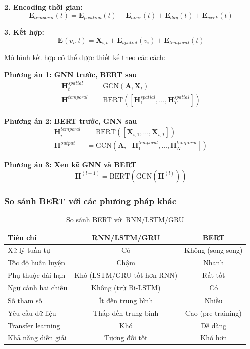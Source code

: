 \textbf{2. Encoding thời gian:}
\begin{equation}
\mathbf{E}_{temporal}(t) = \mathbf{E}_{position}(t) + \mathbf{E}_{hour}(t) + \mathbf{E}_{day}(t) + \mathbf{E}_{week}(t)
\end{equation}

\textbf{3. Kết hợp:}
\begin{equation}
\mathbf{E}(v_i, t) = \mathbf{X}_{i,t} + \mathbf{E}_{spatial}(v_i) + \mathbf{E}_{temporal}(t)
\end{equation}


Mô hình kết hợp có thể được thiết kế theo các cách:

\textbf{Phương án 1: GNN trước, BERT sau}
\begin{align}
\mathbf{H}_t^{spatial} &= \text{GCN}(\mathbf{A}, \mathbf{X}_t) \\
\mathbf{H}^{temporal} &= \text{BERT}([\mathbf{H}_1^{spatial}, \dots, \mathbf{H}_T^{spatial}])
\end{align}

\textbf{Phương án 2: BERT trước, GNN sau}
\begin{align}
\mathbf{H}_i^{temporal} &= \text{BERT}([\mathbf{X}_{i,1}, \dots, \mathbf{X}_{i,T}]) \\
\mathbf{H}^{output} &= \text{GCN}(\mathbf{A}, [\mathbf{H}_1^{temporal}, \dots, \mathbf{H}_N^{temporal}])
\end{align}

\textbf{Phương án 3: Xen kẽ GNN và BERT}
\begin{equation}
\mathbf{H}^{(l+1)} = \text{BERT}(\text{GCN}(\mathbf{H}^{(l)}))
\end{equation}

\subsubsection{So sánh BERT với các phương pháp khác}

\begin{table}[h]
\centering
\caption{So sánh BERT với RNN/LSTM/GRU}
\begin{tabular}{|l|c|c|}
\hline
\textbf{Tiêu chí} & \textbf{RNN/LSTM/GRU} & \textbf{BERT} \\ \hline
Xử lý tuần tự & Có & Không (song song) \\ \hline
Tốc độ huấn luyện & Chậm & Nhanh \\ \hline
Phụ thuộc dài hạn & Khó (LSTM/GRU tốt hơn RNN) & Rất tốt \\ \hline
Ngữ cảnh hai chiều & Không (trừ Bi-LSTM) & Có \\ \hline
Số tham số & Ít đến trung bình & Nhiều \\ \hline
Yêu cầu dữ liệu & Thấp đến trung bình & Cao (pre-training) \\ \hline
Transfer learning & Khó & Dễ dàng \\ \hline
Khả năng diễn giải & Tương đối tốt & Khó hơn \\ \hline
\end{tabular}
\label{tab:bert_vs_rnn}
\end{table}
